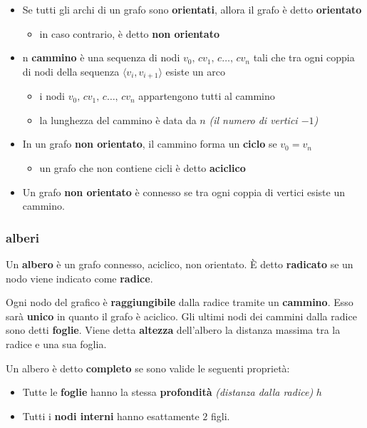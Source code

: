 \documentclass[italian, 10pt]{article}
\begin{document}
\begin{itemize}
  \item Se tutti gli archi di un grafo sono \textbf{orientati}, allora il grafo è detto \textbf{orientato}
        \begin{itemize}
          \item in caso contrario, è detto \textbf{non orientato}
        \end{itemize}
  \item n \textbf{cammino} è una sequenza di nodi \(v_0,\,c v_1,\,c \ldots,\,c v_n\) tali che tra ogni coppia di nodi della sequenza \(\langle v_i, v_{i+1} \rangle\) esiste un arco
        \begin{itemize}
          \item i nodi \(v_0,\,c v_1,\,c \ldots,\,c v_n\) appartengono tutti al cammino
          \item la lunghezza del cammino è data da \(n\) \textit{(il numero di vertici \(-1\))}
        \end{itemize}
  \item In un grafo \textbf{non orientato}, il cammino forma un \textbf{ciclo} se \(v_0 = v_n\)
        \begin{itemize}
          \item un grafo che non contiene cicli è detto \textbf{aciclico}
        \end{itemize}
  \item Un grafo \textbf{non orientato} è connesso se tra ogni coppia di vertici esiste un cammino.
\end{itemize}

\subsubsection{alberi}
\label{sec:alberi}

Un \textbf{albero} è un grafo connesso, aciclico, non orientato.
È detto \textbf{radicato} se un nodo viene indicato come \textbf{radice}.

Ogni nodo del grafico è \textbf{raggiungibile} dalla radice tramite un \textbf{cammino}.
Esso sarà \textbf{unico} in quanto il grafo è aciclico.
Gli ultimi nodi dei cammini dalla radice sono detti \textbf{foglie}.
Viene detta \textbf{altezza} dell'albero la distanza massima tra la radice e una sua foglia.

Un albero è detto \textbf{completo} se sono valide le seguenti proprietà:

\begin{itemize}
  \item Tutte le \textbf{foglie} hanno la stessa \textbf{profondità} \textit{(distanza dalla radice)} \(h\)
  \item Tutti i \textbf{nodi interni} hanno esattamente \(2\) figli.
\end{itemize}
\end{document}
